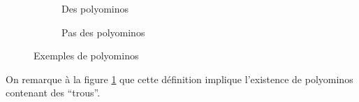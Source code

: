 \begin{figure}
\begin{subfigure}[b]{.5\linewidth}
\centering
{}
\caption{Des polyominos}
\end{subfigure}
\begin{subfigure}[b]{.5\linewidth}
\centering
{}
\caption{Pas des polyominos}
\end{subfigure}
\caption{Exemples de polyominos}\label{fig:exemples-de-polyominos}
\end{figure}

On remarque à la figure \ref{fig:exemples-de-polyominos} que cette définition implique l'existence de polyominos contenant des ``trous''.

